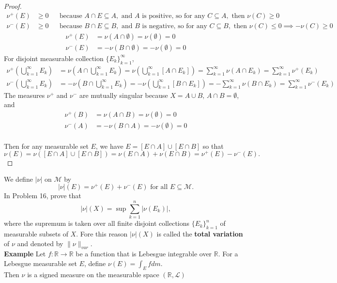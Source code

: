 \begin{flushleft}
\begin{proof}
\begin{align*}
				\nu^+(E)&\ge0&&\text{because }A\cap E\subseteq A,\text{ and }A\text{ is positive, so for any }C\subseteq A,\text{ then }\nu(C)\ge0\\
				\nu^-(E)&\ge0&&\text{because }B\cap E\subseteq B,\text{ and }B\text{ is negative, so for any }C\subseteq B,\text{ then }\nu(C)\le0\implies-\nu(C)\ge0
			\end{align*}
			\begin{align*}
				\nu^+(E)&=\nu(A\cap\emptyset)=\nu(\emptyset)=0\\
				\nu^-(E)&=-\nu(B\cap\emptyset)=-\nu(\emptyset)=0
			\end{align*}
			For disjoint measurable collection $\{E_k\}_{k=1}^\infty$,
			\begin{align*}
				\nu^+(\bigcup_{k=1}^\infty E_k)&=\nu(A\cap\bigcup_{k=1}^\infty E_k)=\nu(\bigcup_{k=1}^\infty [A\cap E_k])=\sum_{k=1}^\infty\nu(A\cap E_k)=\sum_{k=1}^\infty\nu^+(E_k)\\
				\nu^-(\bigcup_{k=1}^\infty E_k)&=-\nu(B\cap\bigcup_{k=1}^\infty E_k)=-\nu(\bigcup_{k=1}^\infty [B\cap E_k])=-\sum_{k=1}^\infty\nu(B\cap E_k)=\sum_{k=1}^\infty\nu^-(E_k)
			\end{align*}
		The measures $\nu^+$ and $\nu^-$ are mutually singular because $X=A\cup B$, $A\cap B=\emptyset$, and 
		\begin{align*}
			\nu^+(B)&=\nu(A\cap B)=\nu(\emptyset)=0\\
			\nu^-(A)&=-\nu(B\cap A)=-\nu(\emptyset)=0
		\end{align*}
		\\Then for any measurable set $E$, we have $E=[E\cap A]\cup[E\cap B]$ so that 
		\[
			\nu(E)=\nu([E\cap A]\cup[E\cap B])=\nu(E\cap A)+\nu(E\cap B)=\nu^+(E)-\nu^-(E).
		\]
	\end{proof}
	We define $|\nu|$ on $\mathcal{M}$ by
	\[
		|\nu|(E)=\nu^+(E)+\nu^-(E)\text{ for all }E\subseteq\mathcal{M}.
	\]
	In Problem 16, prove that 
	\begin{equation*}
		|\nu|(X)=\sup\sum_{k=1}^n|\nu(E_k)|,\tag{4}
	\end{equation*}
	where the supremum is taken over all finite disjoint collections $\{E_k\}_{k=1}^n$ of measurable subsets of $X$.
	Fore this reason $|\nu|(X)$ is called the \textbf{total variation} of $\nu$ and denoted by $\|\nu\|_{var}$.
	\\\bigskip
	\textbf{Example}
	Let $f:\mathbb{R}\to\mathbb{R}$ be a function that is Lebesgue integrable over $\mathbb{R}$.
	For a Lebesgue measurable set $E$, define $\nu(E)=\int_E f dm$.
	\\Then $\nu$ is a signed measure on the measurable space $(\mathbb{R},\mathcal{L})$
\end{flushleft}
